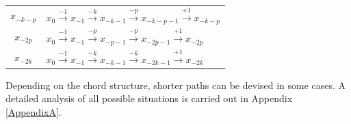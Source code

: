 \begin{center}
\begin{tabular}{|c|l|}
 $x_{-k-p}$  & $ x_{0} \xrightarrow {-1} x_{-1} \xrightarrow {-k} x_{-k-1} \xrightarrow {-p} x_{-k-p-1}\xrightarrow {+1} x_{-k-p} $\\

$x_{-2p}$  & $ x_{0} \xrightarrow {-1} x_{-1} \xrightarrow {-p} x_{-p-1} \xrightarrow {-p} x_{-2p-1}\xrightarrow {+1} x_{-2p} $\\
$x_{-2k}$  & $ x_{0} \xrightarrow {-1} x_{-1} \xrightarrow {-k} x_{-k-1} \xrightarrow {-k} x_{-2k-1}\xrightarrow {+1} x_{-2k} $\\

 \hline
 \end{tabular}
 \end{center}

Depending on the chord structure, shorter paths can be devised in some cases. A detailed analysis of all possible situations is carried out in Appendix \ref{AppendixA}.
 

